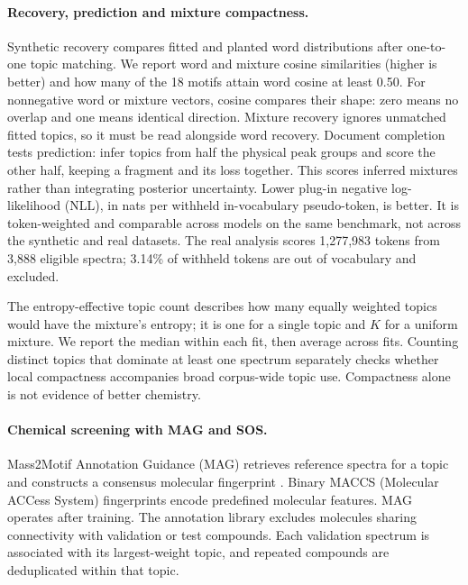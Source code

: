 \documentclass[10pt,a4paper]{article}
\begin{document}
\paragraph{Recovery, prediction and mixture compactness.}
Synthetic recovery compares fitted and planted word distributions after
one-to-one topic matching. We report word and mixture cosine similarities
(higher is better) and how many of the 18 motifs attain word cosine at least
0.50. For nonnegative word or mixture vectors, cosine compares their shape:
zero means no overlap and one means identical direction.
Mixture recovery ignores unmatched fitted topics, so it must be read
alongside word recovery. Document completion tests prediction: infer topics
from half the physical peak groups and score the other half, keeping a
fragment and its loss together. This scores inferred mixtures rather than
integrating posterior uncertainty. Lower plug-in negative log-likelihood (NLL), in nats
per withheld in-vocabulary pseudo-token, is better. It is token-weighted and
comparable across models on the same benchmark, not across the synthetic
and real datasets. The real analysis scores 1,277,983 tokens from 3,888
eligible spectra; 3.14\% of withheld tokens are out of vocabulary and excluded.

The entropy-effective topic count describes how many equally weighted topics
would have the mixture's entropy; it is one for a single topic and $K$ for a
uniform mixture. We report the median within each fit, then average across
fits. Counting distinct topics that dominate at least one spectrum separately
checks whether local compactness accompanies broad corpus-wide topic use.
Compactness alone is not evidence of better chemistry.

\paragraph{Chemical screening with MAG and SOS.}
Mass2Motif Annotation Guidance (MAG) retrieves reference spectra for a topic
and constructs a consensus molecular fingerprint \cite{torresortega2026}.
Binary MACCS (Molecular ACCess System) fingerprints encode predefined molecular
features. MAG operates after training. The annotation library excludes molecules sharing
connectivity with validation or test compounds. Each validation spectrum is
associated with its largest-weight topic, and repeated compounds are
deduplicated within that topic.
\end{document}

